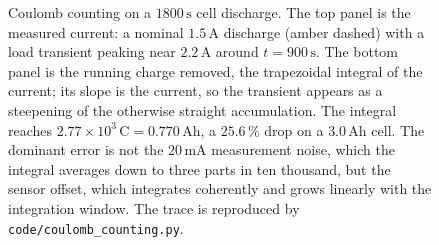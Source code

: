\begin{figure}[htbp]
\begin{tikzpicture}
\end{tikzpicture}
\caption[State of charge by Coulomb counting]{Coulomb counting on a
$1800\,\si{\second}$ cell discharge. The top panel is the measured
current: a nominal $1.5\,\si{\ampere}$ discharge (amber dashed) with a
load transient peaking near $2.2\,\si{\ampere}$ around $t =
900\,\si{\second}$. The bottom panel is the running charge removed, the
trapezoidal integral of the current; its slope is the current, so the
transient appears as a steepening of the otherwise straight
accumulation. The integral reaches $2.77\times 10^{3}\,\si{\coulomb} =
0.770\,\si{\ampere\hour}$, a $25.6\,\%$ drop on a
$3.0\,\si{\ampere\hour}$ cell. The dominant error is not the
$20\,\si{\milli\ampere}$ measurement noise, which the integral
averages down to three parts in ten thousand, but the sensor offset,
which integrates coherently and grows linearly with the integration
window. The trace is reproduced by
\texttt{code/coulomb\_counting.py}.}
\label{fig:vol02:ch06:coulomb-counting}
\end{figure}
